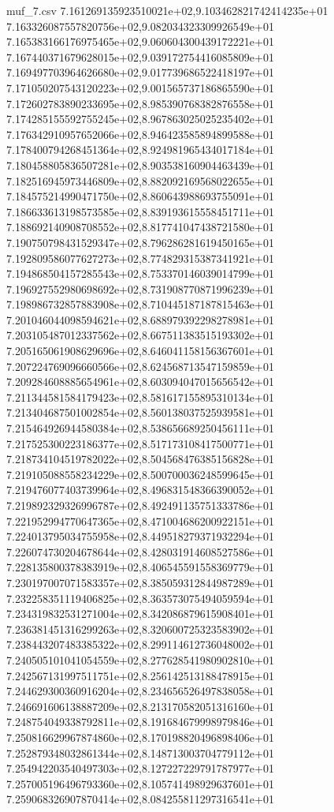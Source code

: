 \begin{filecontents*}{muf_7.csv}
7.161269135923510021e+02,9.103462821742414235e+01
7.163326087557820756e+02,9.082034323309926549e+01
7.165383166176975465e+02,9.060604300439172221e+01
7.167440371679628015e+02,9.039172754416085809e+01
7.169497703964626680e+02,9.017739686522418197e+01
7.171050207543120223e+02,9.001565737186865590e+01
7.172602783890233695e+02,8.985390768382876558e+01
7.174285155592755245e+02,8.967863025025235402e+01
7.176342910957652066e+02,8.946423585894899588e+01
7.178400794268451364e+02,8.924981965434017184e+01
7.180458805836507281e+02,8.903538160904463439e+01
7.182516945973446809e+02,8.882092169568022655e+01
7.184575214990471750e+02,8.860643988693755091e+01
7.186633613198573585e+02,8.839193615558451711e+01
7.188692140908708552e+02,8.817741047438721580e+01
7.190750798431529347e+02,8.796286281619450165e+01
7.192809586077627273e+02,8.774829315387341921e+01
7.194868504157285543e+02,8.753370146039014799e+01
7.196927552980698692e+02,8.731908770871996239e+01
7.198986732857883908e+02,8.710445187187815463e+01
7.201046044098594621e+02,8.688979392298278981e+01
7.203105487012337562e+02,8.667511383515193302e+01
7.205165061908629696e+02,8.646041158156367601e+01
7.207224769096660566e+02,8.624568713547159859e+01
7.209284608885654961e+02,8.603094047015656542e+01
7.211344581584179423e+02,8.581617155895310134e+01
7.213404687501002854e+02,8.560138037525939581e+01
7.215464926944580384e+02,8.538656689250456111e+01
7.217525300223186377e+02,8.517173108417500771e+01
7.218734104519782022e+02,8.504568476385156828e+01
7.219105088558234229e+02,8.500700036248599645e+01
7.219476077403739964e+02,8.496831548366390052e+01
7.219892329326996787e+02,8.492491135751333786e+01
7.221952994770647365e+02,8.471004686200922151e+01
7.224013795034755958e+02,8.449518279371932294e+01
7.226074730204678644e+02,8.428031914608527586e+01
7.228135800378383919e+02,8.406545591558369779e+01
7.230197007071583357e+02,8.385059312844987289e+01
7.232258351119406825e+02,8.363573075494059594e+01
7.234319832531271004e+02,8.342086879615908401e+01
7.236381451316299263e+02,8.320600725323583902e+01
7.238443207483385322e+02,8.299114612736048002e+01
7.240505101041054559e+02,8.277628541980902810e+01
7.242567131997511751e+02,8.256142513188478915e+01
7.244629300360916204e+02,8.234656526497838058e+01
7.246691606138887209e+02,8.213170582051316160e+01
7.248754049338792811e+02,8.191684679998979846e+01
7.250816629967874860e+02,8.170198820496898406e+01
7.252879348032861344e+02,8.148713003704779112e+01
7.254942203540497303e+02,8.127227229791787977e+01
7.257005196496793360e+02,8.105741498929637601e+01
7.259068326907870414e+02,8.084255811297316541e+01

\end{filecontents*}
